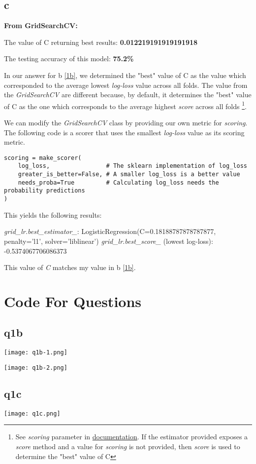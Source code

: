 \documentclass{article}
\begin{document}
\subsection*{c}

\textbf{From GridSearchCV:}

The value of C returning best results: \textbf{0.012219191919191918}

The testing accuracy of this model: \textbf{75.2\%}

In our answer for b \ref{1b}, we determined the "best" value of C as the value which corresponded to the
average lowest \emph{log-loss} value across all folds. The value from the
\emph{GridSearchCV} are different because, by default, it determines the
"best" value of C as the one which corresponds to the average highest \emph{score}
across all folds
\footnote{See \emph{scoring} parameter in \href{https://scikit-learn.org/stable/modules/generated/sklearn.model_selection.GridSearchCV.html}{documentation}.
If the estimator provided exposes a \emph{score} method and a value for
\emph{scoring} is not provided, then \emph{score} is used to determine the
"best" value of C}.

We can modify the \emph{GridSearchCV} class by providing our own metric
for \emph{scoring}. The following code is a scorer that uses
the smallest \emph{log-loss} value as its scoring metric.

\begin{verbatim}
scoring = make_scorer(
    log_loss,                # The sklearn implementation of log_loss
    greater_is_better=False, # A smaller log_loss is a better value
    needs_proba=True         # Calculating log_loss needs the probability predictions
)
\end{verbatim}

This yields the following results:

\emph{grid\_lr.best\_estimator\_}: LogisticRegression(C=0.18188787878787877, penalty='l1', solver='liblinear')
\emph{grid\_lr.best\_score\_} (lowest log-loss): -0.5374067706086373

This value of \emph{C} matches my value in b \ref{1b}.

\newpage
\section*{Code For Questions}

\subsection*{q1b}

\texttt{[image: q1b-1.png]}

\texttt{[image: q1b-2.png]}

\subsection*{q1c}

\texttt{[image: q1c.png]}
\end{document}
